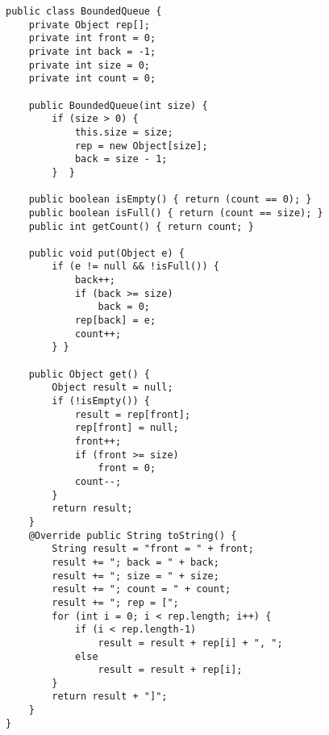 \documentclass[11pt]{article}
\begin{document}
\begin{verbatim}
public class BoundedQueue {
    private Object rep[];
    private int front = 0;
    private int back = -1;
    private int size = 0;
    private int count = 0;

    public BoundedQueue(int size) {
        if (size > 0) {
            this.size = size;
            rep = new Object[size];
            back = size - 1;
        }  }

    public boolean isEmpty() { return (count == 0); }
    public boolean isFull() { return (count == size); }
    public int getCount() { return count; }

    public void put(Object e) {
        if (e != null && !isFull()) {
            back++;
            if (back >= size)
                back = 0;
            rep[back] = e;
            count++;
        } }

    public Object get() {
        Object result = null;
        if (!isEmpty()) {
            result = rep[front];
            rep[front] = null;
            front++;
            if (front >= size)
                front = 0;
            count--;
        }
        return result;
    }
    @Override public String toString() {
        String result = "front = " + front;
        result += "; back = " + back;
        result += "; size = " + size;
        result += "; count = " + count;
        result += "; rep = [";
        for (int i = 0; i < rep.length; i++) {
            if (i < rep.length-1)
                result = result + rep[i] + ", ";
            else
                result = result + rep[i];
        }
        return result + "]";
    }
}

\end{verbatim}
\end{document}
